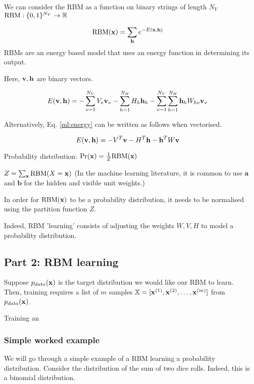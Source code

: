 \documentclass[11pt]{article}
\begin{document}
We can consider the RBM as a function on binary strings of length \(N_V\)
\(\text{RBM}: \{0, 1\}^{N_V} \to \mathbb{R}\)

\[
\text{RBM}(\mathbf{x}) = \sum_{\mathbf{h}} e^{-E(\mathbf{x}, \mathbf{h})}
\]
RBMs are an energy based model that uses an energy function in determining its output.

Here, \(\mathbf{v}, \mathbf{h}\) are binary vectors.


\begin{equation}
E(\mathbf{v}, \mathbf{h}) = -\sum_{v = 1}^{N_V} V_v \mathbf{v}_{v} - \sum_{h = 1}^{N_H} H_h \mathbf{h}_h - \sum_{v = 1}^{N_V} \sum_{h = 1}^{N_H} \mathbf{h}_h W_{hv} \mathbf{v}_v \label{ml:energy}
\end{equation}

Alternatively, Eq. \eqref{ml:energy} can be written as follows when vectorised.

\begin{equation}
E(\mathbf{v}, \mathbf{h}) = -V^{T}\mathbf{v} - H^{T}\mathbf{h} - \mathbf{h}^T W \mathbf{v}
\end{equation}


Probability distribution:
\(
\Pr(\mathbf{x}) = \frac{1}{Z} \text{RBM}(\mathbf{x})
\)

\(
Z = \sum_{\mathbf{x}} \text{RBM}(X = \mathbf{x})
\)
(In the machine learning literature, it is common to use \(\mathbf{a}\) and \(\mathbf{b}\) for the hidden and visible unit weights.)





In order for \(\text{RBM}(\mathbf{x})\) to be a probability distribution, it needs to be normalised using the partition function \(Z\).


Indeed, RBM 'learning' consists of adjusting the weights \(W, V, H\) to model a probability distribution.

\subsection{Part 2: RBM learning}
\label{sec:org767671e}

Suppose \(p_{data}(\mathbf{x})\) is the target distribution we would like our RBM to learn. Then, training requires a list of \(m\) samples \(\mathbb{X} =  [\mathbf{x}^{(1)}, \mathbf{x}^{(2)}, \dots, \mathbf{x}^{(m)}]\) from \(p_{data}(\mathbf{x})\).


Training an


\subsubsection{Simple worked example}
\label{sec:orgcf63d83}

We will go through a simple example of a RBM learning a probability distribution.
Consider the distribution of the sum of two dice rolls. Indeed, this is a binomial distribution.
\end{document}
